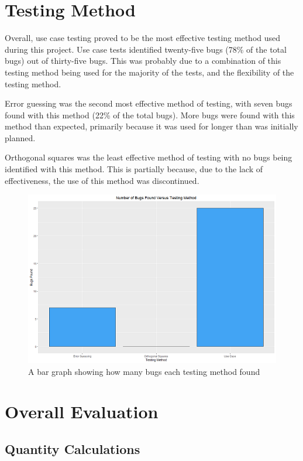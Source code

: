 \section{Testing Method}

Overall, use case testing proved to be the most effective testing method used during this project. Use case tests identified twenty-five bugs (78\% of the total bugs) out of thirty-five bugs. This was probably due to a combination of this testing method being used for the majority of the tests, and the flexibility of the testing method.

Error guessing was the second most effective method of testing, with seven bugs found with this method (22\% of the total bugs). More bugs were found with this method than expected, primarily because it was used for longer than was initially planned.

Orthogonal squares was the least effective method of testing with no bugs being identified with this method. This is partially because, due to the lack of effectiveness, the use of this method was discontinued.

\begin{figure}[h]
\includegraphics{bugsvmeth}
\caption{A bar graph showing how many bugs each testing method found \label{graph}}
\end{figure}


\section{Overall Evaluation}



\subsection{Quantity Calculations}

